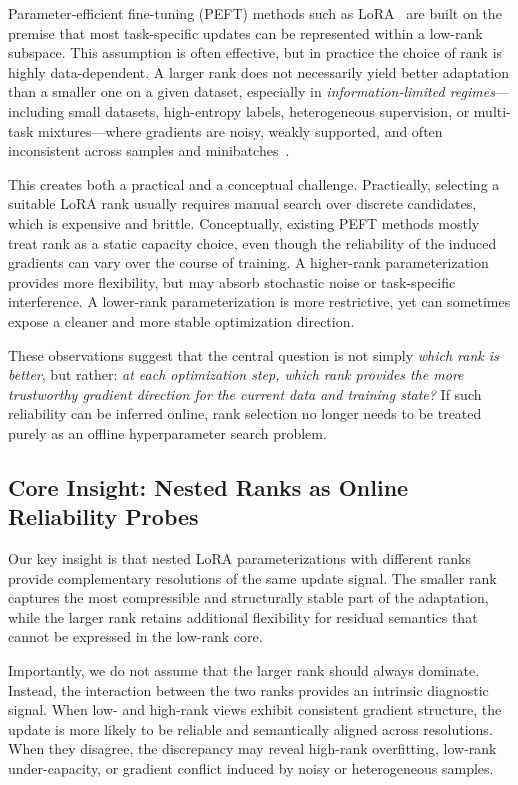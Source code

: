 \documentclass{article}
\begin{document}
Parameter-efficient fine-tuning (PEFT) methods such as LoRA~\cite{hu2022lora}
are built on the premise that most task-specific updates can be represented
within a low-rank subspace.
This assumption is often effective, but in practice the choice of rank is
highly data-dependent.
A larger rank does not necessarily yield better adaptation than a smaller one
on a given dataset, especially in \emph{information-limited regimes}---including
small datasets, high-entropy labels, heterogeneous supervision, or multi-task
mixtures---where gradients are noisy, weakly supported, and often inconsistent
across samples and minibatches~\cite{yu2020pcgrad,liu2021cagrad}.

This creates both a practical and a conceptual challenge.
Practically, selecting a suitable LoRA rank usually requires manual search over
discrete candidates, which is expensive and brittle.
Conceptually, existing PEFT methods mostly treat rank as a static capacity
choice, even though the reliability of the induced gradients can vary over the
course of training.
A higher-rank parameterization provides more flexibility, but may absorb
stochastic noise or task-specific interference.
A lower-rank parameterization is more restrictive, yet can sometimes expose a
cleaner and more stable optimization direction.

These observations suggest that the central question is not simply
\emph{which rank is better}, but rather:
\emph{at each optimization step, which rank provides the more trustworthy
gradient direction for the current data and training state?}
If such reliability can be inferred online, rank selection no longer needs to
be treated purely as an offline hyperparameter search problem.

\subsection{Core Insight: Nested Ranks as Online Reliability Probes}

Our key insight is that nested LoRA parameterizations with different ranks
provide complementary resolutions of the same update signal.
The smaller rank captures the most compressible and structurally stable part of
the adaptation, while the larger rank retains additional flexibility for
residual semantics that cannot be expressed in the low-rank core.

Importantly, we do not assume that the larger rank should always dominate.
Instead, the interaction between the two ranks provides an intrinsic diagnostic
signal.
When low- and high-rank views exhibit consistent gradient structure, the update
is more likely to be reliable and semantically aligned across resolutions.
When they disagree, the discrepancy may reveal high-rank overfitting,
low-rank under-capacity, or gradient conflict induced by noisy or heterogeneous
samples.
\end{document}
